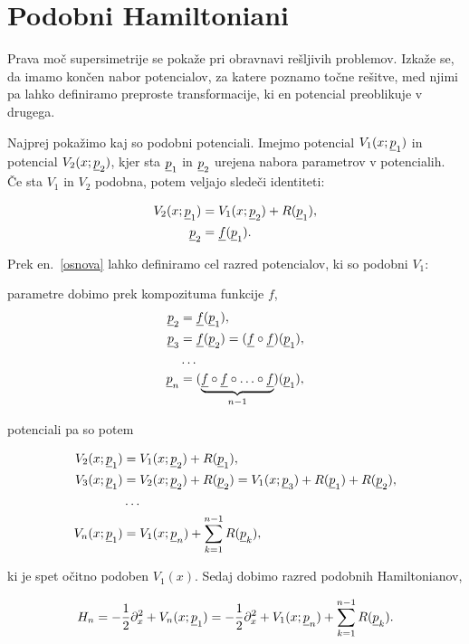 \section{Podobni Hamiltoniani}

Prava mo\v c supersimetrije se poka\v ze pri obravnavi re\v sljivih problemov. Izka\v ze se, da
imamo kon\v cen nabor potencialov, za katere poznamo to\v cne re\v sitve, med njimi pa lahko definiramo
preproste transformacije, ki en potencial preoblikuje v drugega.

Najprej poka\v zimo kaj so podobni potenciali. Imejmo potencial $V_1 (x; \underline{p}_1)$ in potencial
$V_2 (x; \underline{p}_2)$, kjer sta $\underline{p}_1$ in $\underline{p}_2$ urejena nabora parametrov v potencialih. \v Ce sta
$V_1$ in $V_2$ podobna, potem veljajo slede\v ci identiteti:

\begin{align}
	V_2 (x; \underline{p}_1) &= V_1 (x; \underline{p}_2) + R (\underline{p}_1), \\
	\underline{p}_2 &= \underline{f} (\underline{p}_1). \label{osnova}
\end{align}

Prek en.~\eqref{osnova} lahko definiramo cel razred potencialov, ki so podobni $V_1$:

parametre dobimo prek kompozituma funkcije $f$,
\begin{align}
	\underline{p}_2 &= \underline{f} (\underline{p}_1), \notag \\
	\underline{p}_3 &= \underline{f} (\underline{p}_2) = (\underline{f} \circ \underline{f}) (\underline{p}_1), \notag \\
	&\ldots \notag \\
	\underline{p}_n &= (\underbrace{\underline{f} \circ \underline{f} \circ \ldots \circ \underline{f}}_{n-1}) (\underline{p}_1),
\end{align}

potenciali pa so potem

\begin{align}
	V_2 (x; \underline{p}_1) &= V_1 (x; \underline{p}_2) + R (\underline{p}_1), \notag \\
	V_3 (x; \underline{p}_1) &= V_2 (x; \underline{p}_2) + R (\underline{p}_2) = V_1 (x; \underline{p}_3) + R (\underline{p}_1) + R (\underline{p}_2), \notag \\
	&\ldots \notag \\
	V_n (x; \underline{p}_1) &= V_1 (x; \underline{p}_n) + \sum_{k = 1}^{n-1} R (\underline{p}_k),
\end{align}

ki je spet o\v citno podoben $V_1 (x)$. Sedaj dobimo razred podobnih Hamiltonianov,

\begin{equation}
	H_n = - \frac{1}{2}\partial_x^2 + V_n (x;\underline{p}_1) = - \frac{1}{2}\partial_x^2+V_1(x;\underline{p}_n)+\sum_{k = 1}^{n-1}R(\underline{p}_k).
\end{equation}

